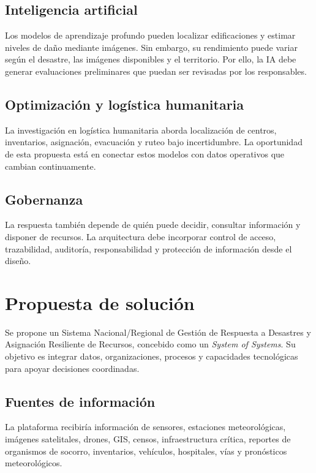 \documentclass[11pt,a4paper]{article}
\begin{document}
\subsection{Inteligencia artificial}

Los modelos de aprendizaje profundo pueden localizar edificaciones y estimar
niveles de daño mediante imágenes. Sin embargo, su rendimiento puede variar
según el desastre, las imágenes disponibles y el territorio. Por ello, la IA
debe generar evaluaciones preliminares que puedan ser revisadas por los
responsables.

\subsection{Optimización y logística humanitaria}

La investigación en logística humanitaria aborda localización de centros,
inventarios, asignación, evacuación y ruteo bajo incertidumbre. La oportunidad
de esta propuesta está en conectar estos modelos con datos operativos que
cambian continuamente.

\subsection{Gobernanza}

La respuesta también depende de quién puede decidir, consultar información y
disponer de recursos. La arquitectura debe incorporar control de acceso,
trazabilidad, auditoría, responsabilidad y protección de información desde el
diseño.

\section{Propuesta de solución}

Se propone un Sistema Nacional/Regional de Gestión de Respuesta a Desastres y
Asignación Resiliente de Recursos, concebido como un \emph{System of Systems}.
Su objetivo es integrar datos, organizaciones, procesos y capacidades
tecnológicas para apoyar decisiones coordinadas.

\subsection{Fuentes de información}

La plataforma recibiría información de sensores, estaciones meteorológicas,
imágenes satelitales, drones, GIS, censos, infraestructura crítica, reportes
de organismos de socorro, inventarios, vehículos, hospitales, vías y
pronósticos meteorológicos.
\end{document}
